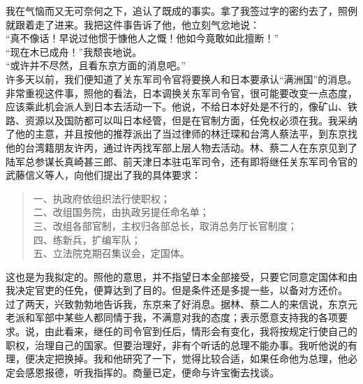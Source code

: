 我在气恼而又无可奈何之下，追认了既成的事实。拿了我签过字的密约去了，照例就跟着走了进来。我把这件事告诉了他，他立刻气忿地说：\\

“真不像话！早说过他惯于慷他人之慨！他如今竟敢如此擅断！”\\

“现在木已成舟！”我颓丧地说。\\

“或许并不尽然，且看东京方面的消息吧。”\\

许多天以前，我们便知道了关东军司令官将要换人和日本要承认“满洲国”的消息。非常重视这件事，照他的看法，日本调换关东军司令官，很可能要改变一点态度，应该乘此机会派人到日本去活动一下。他说，不给日本好处是不行的，像矿山、铁路、资源以及国防都可以叫日本经管，但是在官制方面，任免权必须在我。我采纳了他的主意，并且按他的推荐派出了当过律师的林迁琛和台湾人蔡法平，到东京找他的台湾籍朋友许丙，通过许丙找军部上层人物去活动。林、蔡二人在东京见到了陆军总参谋长真崎甚三郎、前天津日本驻屯军司令，还有即将继任关东军司令官的武藤信义等人，向他们提出了我的具体要求：\\

\begin{quote}
	一、执政府依组织法行使职权；\\

二、改组国务院，由执政另提任命名单；\\

三、改组各部官制，主权归各部总长，取消总务厅长官制度；\\

四、练新兵，扩编军队；\\

五、立法院克期召集议会，定国体。\\
\end{quote}

这也是为我拟定的。照他的意思，并不指望日本全部接受，只要它同意定国体和由我决定官吏的任免，便算达到了目的。但是条件还是多提一些，以备对方还价。\\

过了两天，兴致勃勃地告诉我，东京来了好消息。据林、蔡二人的来信说，东京元老派和军部中某些人都同情于我，不满意对我的态度；表示愿意支持我的各项要求。说，由此看来，继任的司令官到任后，情形会有变化，我将按规定行使自己的职权，治理自己的国家。但要治理好，非有个听话的总理不能办事。我听他说的有理，便决定把换掉。我和他研究了一下，觉得比较合适，如果任命他为总理，他必定会感恩报德，听我指挥的。商量已定，便命与许宝衡去找谈。\\

